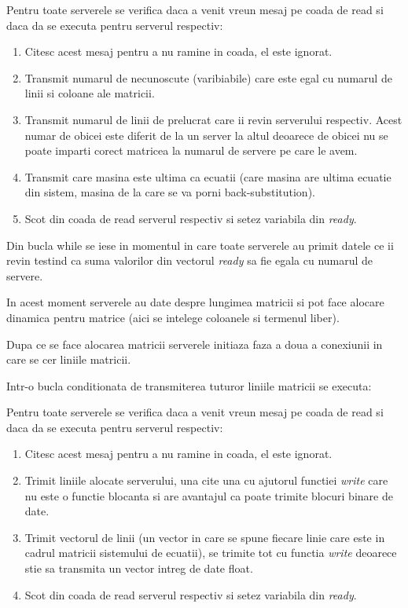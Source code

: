 Pentru toate serverele se verifica daca a venit vreun mesaj pe coada de read
si daca da se executa pentru serverul respectiv:
\begin{enumerate}
\item Citesc acest mesaj pentru a nu ramine in coada, el este ignorat.
\item Transmit numarul de necunoscute (varibiabile) care este egal cu
numarul de linii si coloane ale matricii.
\item Transmit numarul de linii de prelucrat care ii revin serverului
respectiv. Acest numar de obicei este diferit de la un server la altul
deoarece de obicei nu se poate imparti corect matricea la numarul de servere
pe care le avem.
\item Transmit care masina este ultima ca ecuatii (care masina are ultima
ecuatie din sistem, masina de la care se va porni back-substitution).
\item Scot din coada de read serverul respectiv si setez variabila din {\it
ready}.
\end{enumerate}

Din bucla while se iese in momentul in care toate serverele au primit datele
ce ii revin testind ca suma valorilor din vectorul {\it ready} sa fie egala
cu numarul de servere.

In acest moment serverele au date despre lungimea matricii si pot face
alocare dinamica pentru matrice (aici se intelege coloanele si termenul
liber).

Dupa ce se face alocarea matricii serverele initiaza faza a doua a
conexiunii in care se cer liniile matricii.

Intr-o bucla conditionata de transmiterea tuturor liniile matricii se
executa:

Pentru toate serverele se verifica daca a venit vreun mesaj pe coada de read
si daca da se executa pentru serverul respectiv:
\begin{enumerate}
\item Citesc acest mesaj pentru a nu ramine in coada, el este ignorat.
\item Trimit liniile alocate serverului, una cite una cu ajutorul functiei
{\it write} care nu este o functie blocanta si are avantajul ca poate
trimite blocuri binare de date.
\item Trimit vectorul de linii (un vector in care se spune fiecare linie
care este in cadrul  matricii sistemului de ecuatii), se trimite tot cu
functia {\it write} deoarece stie sa transmita un vector intreg de date
float.
\item Scot din coada de read serverul respectiv si setez variabila din {\it
ready}.
\end{enumerate}

